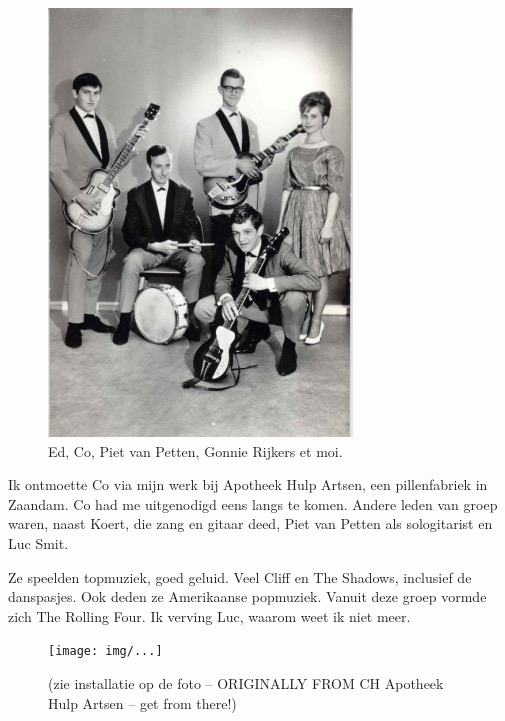 \documentclass[12pt,twoside, openright]{memoir}
\begin{document}
\begin{figure}
\includegraphics[width=\textwidth]{img/ch26/rollingfour}
\caption*{\footnotesize Ed, Co, Piet van Petten, Gonnie Rijkers et moi.}
\end{figure}

Ik ontmoette Co via mijn werk bij Apotheek Hulp Artsen, een pillenfabriek in Zaandam. Co had me uitgenodigd eens langs te komen. Andere leden van groep waren, naast Koert, die zang en gitaar deed, Piet van Petten als sologitarist en Luc Smit.  

Ze speelden topmuziek, goed geluid. Veel Cliff en The Shadows, inclusief de danspasjes. Ook deden ze Amerikaanse popmuziek. Vanuit deze groep vormde zich The Rolling Four. Ik verving Luc, waarom weet ik niet meer.

\begin{figure}[t]
\texttt{[image: img/...]}
\caption{(zie installatie op de foto -- ORIGINALLY FROM CH Apotheek Hulp Artsen -- get from there!)}
\end{figure}
\end{document}

